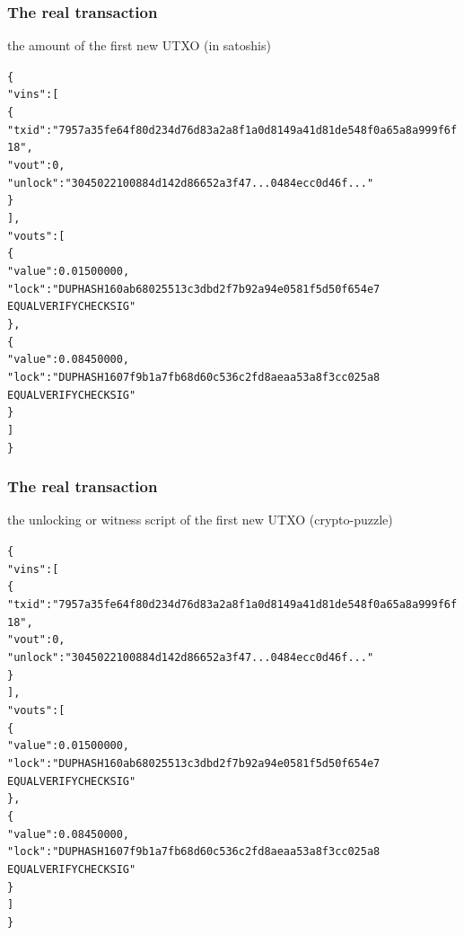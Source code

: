 \documentclass[11pt]{beamer}  %
\begin{document}
\begin{frame}[fragile]\frametitle{The real transaction}

  \begin{center}
    the amount of the first new UTXO (in satoshis)
  \end{center}

  {\scriptsize\begin{alltt}
\{
  "vins": [
    \{
      "txid": "7957a35fe64f80d234d76d83a2a8f1a0d8149a41d81de548f0a65a8a999f6f18",
      "vout": 0,
      "unlock": "3045022100884d142d86652a3f47... 0484ecc0d46f..."
    \}
  ],
  "vouts": [
    \{
      \alert{"value": 0.01500000},
      "lock": "DUP HASH160 ab68025513c3dbd2f7b92a94e0581f5d50f654e7
               EQUALVERIFY CHECKSIG"
    \},
    \{
      "value": 0.08450000,
      "lock": "DUP HASH160 7f9b1a7fb68d60c536c2fd8aeaa53a8f3cc025a8
               EQUALVERIFY CHECKSIG"
    \}
  ]
\}
\end{alltt}}

\end{frame}

\begin{frame}[fragile]\frametitle{The real transaction}

  \begin{center}
    the unlocking or witness script of the first new UTXO (crypto-puzzle)
  \end{center}

  {\scriptsize\begin{alltt}
\{
  "vins": [
    \{
      "txid": "7957a35fe64f80d234d76d83a2a8f1a0d8149a41d81de548f0a65a8a999f6f18",
      "vout": 0,
      "unlock": "3045022100884d142d86652a3f47... 0484ecc0d46f..."
    \}
  ],
  "vouts": [
    \{
      "value": 0.01500000,
      \alert{"lock": "DUP HASH160 ab68025513c3dbd2f7b92a94e0581f5d50f654e7
               EQUALVERIFY CHECKSIG"}
    \},
    \{
      "value": 0.08450000,
      "lock": "DUP HASH160 7f9b1a7fb68d60c536c2fd8aeaa53a8f3cc025a8
               EQUALVERIFY CHECKSIG"
    \}
  ]
\}
\end{alltt}}

\end{frame}
\end{document}

